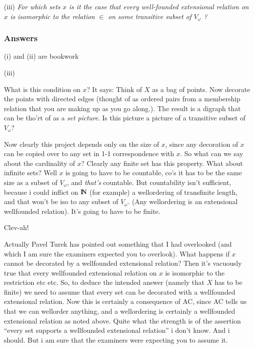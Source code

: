 \documentclass{book}
\begin{document}
\smallskip

\noindent (iii) {\sl For which sets $x$ is it the case that every well-founded extensional relation on $x$ is isomorphic to the relation $\in$ on some transitive subset of $V_\omega$ ?}

\medskip

\subsubsection*{Answers}

(i) and (ii) are bookwork

\smallskip

\noindent (iii)

What is this condition on $x$?  It says: Think of $X$ as a bag of
points.  Now decorate the points with directed edges (thought of as
ordered pairs from a membership relation that you are making up as you
go along.).  The result is a digraph that can be tho'rt of as a {\sl
  set picture}.   Is this picture a picture of a transitive subset of $V_\omega$?

Now clearly this project depends only on the size of $x$, since any
decoration of $x$ can be copied over to any set in 1-1 correspondence
with $x$.  So what can we say about the cardinality of $x$?  Clearly
any finite set has this property. What about infinite sets?
Well $x$ is going to have to be countable, co's it has
to be the same size as a subset of $V_\omega$, and {\sl that's}
countable.  But countability isn't sufficient, because i could inflict
on $\hbox{\rm I\negthinspace N}$ (for example) a wellordering of transfinite length, and that
won't be iso to any subset of $V_\omega$.  (Any wellordering is an
extensional wellfounded relation). It's going to have to be finite.

Clev-ah!

\smallskip

Actually Pavel Turek has pointed out something that I had overlooked
(and which I am sure the examiners expected you to overlook).  What
happens if $x$ cannot be decorated by a wellfounded extensional
relation?  Then it's vacuously true that every wellfounded extensional
relation on $x$ is isomorphic to the restriction etc etc.  So, to
deduce the intended answer (namely that $X$ has to be finite) we need
to assume that every set can be decorated with a wellfounded
extensional relation.  Now this is certainly a consequence of AC,
since AC tells us that we can wellorder anything, and a wellordering
is certainly a wellfounded extensional relation as noted above.  Quite
what the strength is of the assertion ``every set supports a
wellfounded extensional relation'' i don't know.  And i should.  But i
am sure that the examiners were expecting you to assume it.
\end{document}

